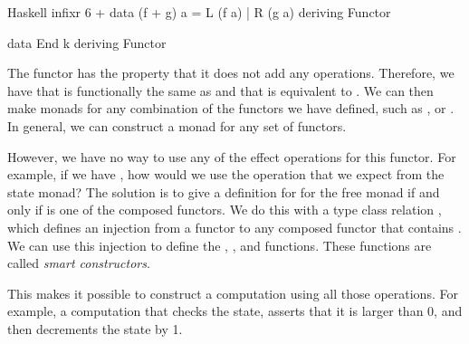 \begin{lst}{Haskell}
infixr 6 +
data (f + g) a = L (f a) | R (g a)
  deriving Functor

data End k
  deriving Functor
\end{lst}
%
The  functor has the property that it does not add any operations. Therefore, we have that
 is functionally the same as  and that  is equivalent to . We can then make monads for any combination of the functors we have defined, such as ,  or . In general, we can construct a monad for any set of functors.

However, we have no way to use any of the effect operations for this functor. For example, if we have , how would we use the  operation that we expect from the state monad? The solution is to give a definition for  for the free monad if and only if  is one of the composed functors. We do this with a type class relation \hs{<}, which defines an injection from a functor  to any composed functor  that contains . We can use this injection to define the , , and  functions. These functions are called \emph{smart constructors}.

%
This makes it possible to construct a computation using all those operations. For example, a computation that checks the state, asserts that it is larger than 0, and then decrements the state by 1.

